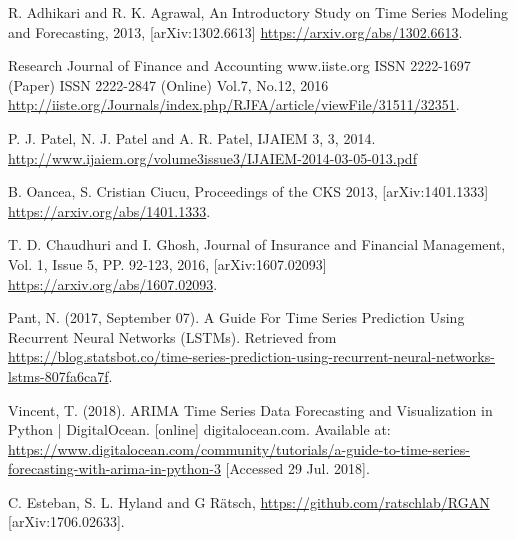 \documentclass[10pt,a4paper]{article}
\begin{document}
\begin{thebibliography}{9}

R. Adhikari and R. K. Agrawal, An Introductory Study on Time Series Modeling and Forecasting, 2013, [arXiv:1302.6613] \url{https://arxiv.org/abs/1302.6613}.

Research Journal of Finance and Accounting www.iiste.org
ISSN 2222-1697 (Paper) ISSN 2222-2847 (Online)
Vol.7, No.12, 2016 \url{http://iiste.org/Journals/index.php/RJFA/article/viewFile/31511/32351}.

 P. J. Patel,  N. J. Patel and A. R. Patel, IJAIEM 3, 3, 2014. \url{http://www.ijaiem.org/volume3issue3/IJAIEM-2014-03-05-013.pdf}

 B. Oancea, S. Cristian Ciucu, Proceedings of the CKS 2013, [arXiv:1401.1333] \url{https://arxiv.org/abs/1401.1333}.

 T. D. Chaudhuri and I. Ghosh,	Journal of Insurance and Financial Management, Vol. 1, Issue 5, PP. 92-123, 2016,  [arXiv:1607.02093] \url{https://arxiv.org/abs/1607.02093}.

 Pant, N. (2017, September 07). A Guide For Time Series Prediction Using Recurrent Neural Networks (LSTMs). Retrieved from \url{https://blog.statsbot.co/time-series-prediction-using-recurrent-neural-networks-lstms-807fa6ca7f}.


 Vincent, T. (2018). ARIMA Time Series Data Forecasting and Visualization in Python | DigitalOcean. [online] digitalocean.com. Available at: \url{https://www.digitalocean.com/community/tutorials/a-guide-to-time-series-forecasting-with-arima-in-python-3} [Accessed 29 Jul. 2018].

 C. Esteban, S. L. Hyland and G R\"{a}tsch, \url{https://github.com/ratschlab/RGAN} [arXiv:1706.02633]. 

\end{thebibliography}
\end{document}
